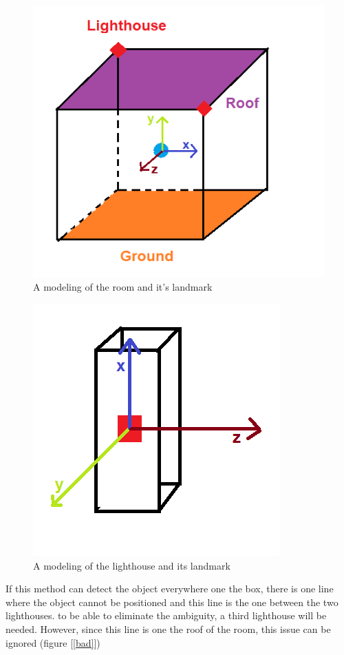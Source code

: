 \documentclass{vldb}
\begin{document}
\begin{figure}
\centering
\includegraphics[width=1.0\columnwidth]{Image/box.png}
\caption{A modeling of the room and it's landmark}
\label{box}
\end{figure}
\begin{figure}
\centering
\includegraphics[width=0.6\columnwidth]{Image/lighthouse.png}
\caption{A modeling of the lighthouse and its landmark}
\label{lighthouse}
\end{figure}
If this method can detect the object everywhere one the box, there is one line where the object cannot be positioned and this line is the one between the two lighthouses. to be able to eliminate the ambiguity, a third lighthouse will be needed. However, since this line is one the roof of the room, this issue can be ignored (figure [\ref{bad}])
\end{document}
